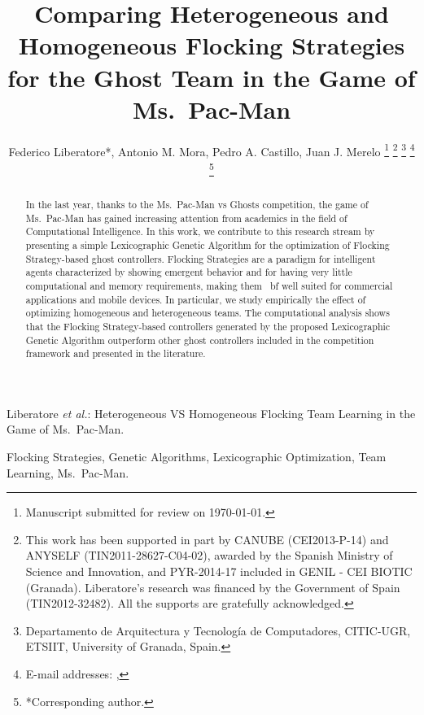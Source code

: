 \documentclass[journal]{IEEEtran}
\begin{document}
\title{Comparing Heterogeneous and Homogeneous Flocking Strategies for the Ghost Team in the Game of Ms.\  Pac-Man}

\author{Federico Liberatore*, Antonio M. Mora, Pedro A. Castillo, Juan J. Merelo
\thanks{Manuscript submitted for review on \today.}%
\thanks{This work has been supported in part by CANUBE (CEI2013-P-14) and ANYSELF (TIN2011-28627-C04-02), awarded by the Spanish Ministry of Science and Innovation, and PYR-2014-17 included in GENIL - CEI BIOTIC (Granada). Liberatore's research was financed by the Government of Spain (TIN2012-32482). All the supports are gratefully acknowledged.}%
\thanks{Departamento de Arquitectura y Tecnolog\'ia de Computadores,
CITIC-UGR, ETSIIT,
University of Granada, Spain.}%
\thanks{E-mail addresses: \mailsa, \mailsb}%
\thanks{*Corresponding author.}}

%
{Liberatore \MakeLowercase{\textit{et al.}}: Heterogeneous VS Homogeneous Flocking Team Learning in the Game of Ms.\  Pac-Man.}
\maketitle

\begin{abstract}
In the last year, thanks to the Ms.\  Pac-Man vs Ghosts competition, the
game of Ms.\  Pac-Man has gained increasing attention from academics in
the field of Computational Intelligence. In this work, we contribute
to this research stream by presenting a simple Lexicographic Genetic
Algorithm for the optimization of Flocking Strategy-based ghost
controllers. Flocking Strategies are a paradigm for intelligent agents
characterized by showing emergent behavior and for having very little
computational and memory requirements, making them {\ bf well suited} for
commercial applications and mobile devices. In particular, we study
empirically the effect of optimizing homogeneous and heterogeneous
teams. The computational analysis shows that the Flocking
Strategy-based controllers generated by the proposed Lexicographic %
Genetic Algorithm outperform other ghost controllers
included in the competition framework and presented in the
literature. 
\end{abstract}
\begin{IEEEkeywords}
Flocking Strategies, Genetic Algorithms, Lexicographic Optimization, Team Learning, Ms.\  Pac-Man.
\end{IEEEkeywords}
\end{document}

